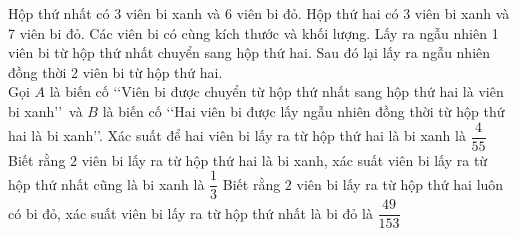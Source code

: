 \begin{ex}%
	Hộp thứ nhất có 3 viên bi xanh và 6 viên bi đỏ. Hộp thứ hai có 3 viên bi xanh và 7 viên bi đỏ. 
	Các viên bi có cùng kích thước và khối lượng. Lấy ra ngẫu nhiên 1 viên bi từ hộp thứ nhất 
	chuyển sang hộp thứ hai. Sau đó lại lấy ra ngẫu nhiên đồng thời 2 viên bi từ hộp thứ hai.\\
	Gọi $A$ là biến cố \lq\lq Viên bi được chuyển từ hộp thứ nhất sang hộp thứ hai là viên bi xanh\rq\rq\, và $B$ là biến cố \lq\lq Hai viên bi được lấy ngẫu nhiên đồng thời từ hộp thứ hai là bi xanh\rq\rq.
	{\True Xác suất để hai viên bi lấy ra từ hộp thứ hai là bi xanh là $\dfrac{4}{55}$}
	{Biết rằng $2$ viên bi lấy ra từ hộp thứ hai là bi xanh, xác suất viên bi lấy ra từ hộp thứ nhất cũng là bi xanh là $\dfrac{1}{3}$}
	{Biết rằng $2$ viên bi lấy ra từ hộp thứ hai luôn có bi đỏ, xác suất viên bi lấy ra từ hộp thứ nhất là bi đỏ là $\dfrac{49}{153}$}
\end{ex}
